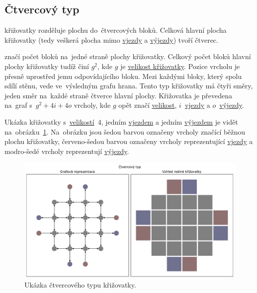 \subsection{Čtvercový typ}\label{subsec:ctvercovy_typ}

 křižovatky rozděluje plochu do~čtvercových bloků.
Celková hlavní plocha křižovatky (tedy veškerá plocha mimo
\hyperref[par:vjezdy]{vjezdy} a \hyperref[par:vyjezdy]{výjezdy}) tvoří čtverec.

 značí počet bloků na~jedné straně plochy křižovatky.
Celkový počet bloků hlavní plochy křižovatky tudíž činí $g^2$,
kde $g$ je \hyperref[par:velikost_krizovatky]{velikost křižovatky}.
Pozice vrcholu je přesně uprostřed jemu odpovídajícího bloku.
Mezi každými bloky, který spolu sdílí stěnu, vede ve~výsledným grafu hrana.
Tento typ křižovatky má čtyři směry, jeden směr na~každé straně čtverce hlavní plochy.
Křižovatka je převedena na~graf s~$g^2 + 4i + 4o$ vrcholy,
kde $g$ opět značí \hyperref[par:velikost_krizovatky]{velikost},
$i$~\hyperref[par:vjezdy]{vjezdy} a $o$~\hyperref[par:vyjezdy]{výjezdy}.

Ukázka křižovatky s~\hyperref[par:velikost_krizovatky]{velikostí}~$4$, jedním \hyperref[par:vjezdy]{vjezdem} a
jedním \hyperref[par:vyjezdy]{výjezdem} je vidět na~obrázku~\ref{fig:square_type_graph}.
Na~obrázku jsou šedou barvou označeny vrcholy značící běžnou plochu křižovatky,
červeno-šedou barvou označeny vrcholy reprezentující \hyperref[par:vjezdy]{vjezdy} a
modro-šedé vrcholy reprezentují \hyperref[par:vyjezdy]{výjezdy}.

\begin{figure}[h]
	\centering
	\includegraphics[width=\textwidth]{../img/Square_grid}
	\caption{Ukázka čtvercového typu křižovatky.}
	\label{fig:square_type_graph}
\end{figure}

